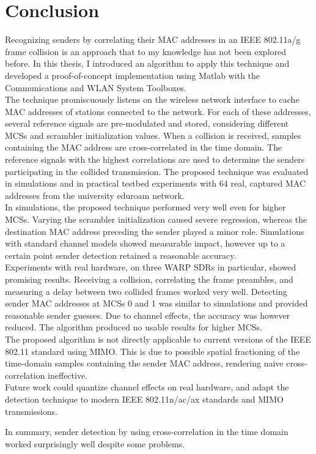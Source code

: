 
\chapter{Conclusion}\label{ch:Conclusion}
\glsresetall %
 

Recognizing senders by correlating their \gls{MAC} addresses in an IEEE 802.11a/g frame collision is an approach that to my knowledge has not been explored before. In this thesis, I introduced an algorithm to apply this technique and developed a proof-of-concept implementation using Matlab with the Communications and WLAN System Toolboxes.\\

The technique promiscuously listens on the wireless network interface to cache \gls{MAC} addresses of stations connected to the network. For each of these addresses, several reference signals are pre-modulated and stored, considering different \glspl{MCS} and scrambler initialization values. When a collision is received, samples containing the \gls{MAC} address are cross-correlated in the time domain. The reference signals with the highest correlations are used to determine the senders participating in the collided transmission. The proposed technique was evaluated in simulations and in practical testbed experiments with 64 real, captured \gls{MAC} addresses from the university eduroam network.\\

In simulations, the proposed technique performed very well even for higher \glspl{MCS}. Varying the scrambler initialization caused severe regression, whereas the destination \gls{MAC} address preceding the sender played a minor role. Simulations with standard channel models showed measurable impact, however up to a certain point sender detection retained a reasonable accuracy.\\

Experiments with real hardware, on three \gls{WARP} \glspl{SDR} in particular, showed promising results. Receiving a collision, correlating the frame preambles, and measuring a delay between two collided frames worked very well. Detecting sender \gls{MAC} addresses at \glspl{MCS} 0 and 1 was similar to simulations and provided reasonable sender guesses. Due to channel effects, the accuracy was however reduced. The algorithm produced no usable results for higher \glspl{MCS}.\\

The proposed algorithm is not directly applicable to current versions of the IEEE 802.11 standard using \gls{MIMO}. This is due to possible spatial fractioning of the time-domain samples containing the sender \gls{MAC} address, rendering naive cross-correlation ineffective.\\

Future work could quantize channel effects on real hardware, and adapt the detection technique to modern IEEE 802.11n/ac/ax standards and \gls{MIMO} transmissions.

In summary, sender detection by using cross-correlation in the time domain worked surprisingly well despite some problems.
